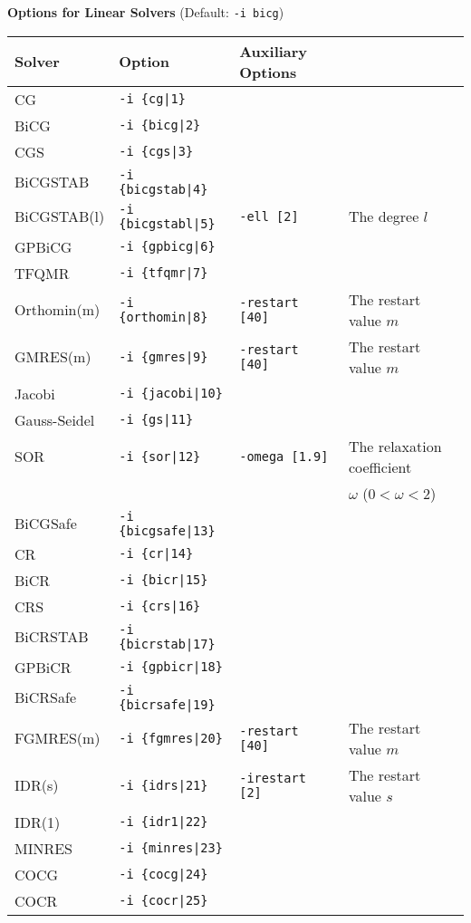 \documentclass[a4paper]{article}
\begin{document}
\begin{minipage}[t]{\textwidth}
\begin{center}
{\bf Options for Linear Solvers} (Default: \verb=-i bicg=) \\
\begin{tabular}{l|lll}\hline\hline
 Solver      & Option              &  Auxiliary Options  & \\ \hline
 CG          & \verb=-i {cg|1}=         &    \\ 
 BiCG        & \verb=-i {bicg|2}=       &    \\
 CGS         & \verb=-i {cgs|3}=        &    \\
 BiCGSTAB    & \verb=-i {bicgstab|4}=   &    \\
 BiCGSTAB(l) & \verb=-i {bicgstabl|5}=  & \verb=-ell [2]=      & The degree $l$ \\
 GPBiCG      & \verb=-i {gpbicg|6}=     &    \\
 TFQMR       & \verb=-i {tfqmr|7}=      &    \\
 Orthomin(m) & \verb=-i {orthomin|8}=   & \verb=-restart [40]= & The restart
 value $m$  \\
 GMRES(m)    & \verb=-i {gmres|9}=      & \verb=-restart [40]= & The restart value $m$  \\ 
 Jacobi      & \verb=-i {jacobi|10}=    &    \\
 Gauss-Seidel& \verb=-i {gs|11}=        &    \\
 SOR         & \verb=-i {sor|12}=       & \verb=-omega [1.9]=  & The relaxation coefficient \\
             &                          &                      & $\omega$ ($0<\omega<2$) \\
 BiCGSafe    & \verb=-i {bicgsafe|13}=     &    \\
 CR          & \verb=-i {cr|14}=        &    \\ 
 BiCR        & \verb=-i {bicr|15}=      &    \\
 CRS         & \verb=-i {crs|16}=       &    \\
 BiCRSTAB    & \verb=-i {bicrstab|17}=  &    \\
 GPBiCR      & \verb=-i {gpbicr|18}=    &    \\
 BiCRSafe    & \verb=-i {bicrsafe|19}=  &    \\
 FGMRES(m)   & \verb=-i {fgmres|20}=    & \verb=-restart [40]= & The restart value $m$   \\ 
 IDR(s)      & \verb=-i {idrs|21}=      & \verb=-irestart [2]= & The restart
 value $s$  \\
 IDR(1)      & \verb=-i {idr1|22}=      &    \\ 
 MINRES      & \verb=-i {minres|23}=    &    \\
 COCG        & \verb=-i {cocg|24}=      &    \\
 COCR        & \verb=-i {cocr|25}=      &    \\   
\hline         
\end{tabular}
\end{center}
\end{minipage}
\end{document}
